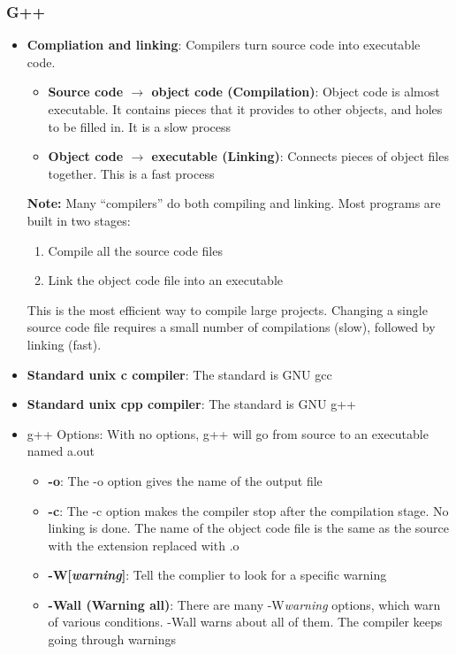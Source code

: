 \documentclass{report}
\begin{document}
   \subsubsection{G++}
   \begin{itemize}
       \item \textbf{Compliation and linking}:
           Compilers turn source code into executable code.
           \begin{itemize}
               \item \textbf{Source code $\to$ object code (Compilation)}: Object code is almost executable. It contains pieces that it provides to other objects, and holes to be filled in. It is a slow process
               \item \textbf{Object code $\to$ executable (Linking)}: Connects pieces of object files together. This is a fast process
           \end{itemize}
           \bigbreak \noindent 
           \textbf{Note:}  Many “compilers” do both compiling and linking. Most programs are built in two stages:
           \begin{enumerate}
               \item Compile all the source code files
                \item Link the object code file into an executable
           \end{enumerate}
           This is the most efficient way to compile large projects.  Changing a single source code file requires a small number of compilations (slow), followed by linking (fast).
        \item \textbf{Standard unix c compiler}: The standard is GNU gcc
        \item \textbf{Standard unix cpp compiler}: The standard is GNU g++
        \item {g++ Options}: With no options, g++ will go from source to an executable named a.out
            \begin{itemize}
                \item \textbf{-o}: The -o option gives the name of the output file
                \item \textbf{-c}: The -c option makes the compiler stop after the compilation stage. No linking is done. The name of the object code file is the same as the source with the extension replaced with .o
                \item \textbf{-W[\textit{warning}]}: Tell the complier to look for a specific warning
                \item \textbf{-Wall (Warning all)}: There are many -W\textit{warning} options, which warn of various conditions. -Wall warns about all of them. The compiler keeps going through warnings

\end{itemize}
\end{itemize}
\end{document}

